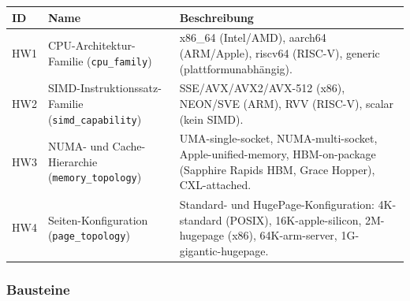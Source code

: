 \begin{scriptsize}
\begin{longtable}{@{}>{\raggedright\arraybackslash}p{1.8cm} >{\raggedright\arraybackslash}p{3.2cm} >{\raggedright\arraybackslash}p{8.5cm}@{}}
\toprule
ID & Name & Beschreibung \\
\midrule
\endhead%
HW1 & CPU-Architektur-Familie (\texttt{cpu\_\allowbreak{}family}) & x86\_\allowbreak{}64 (Intel/\allowbreak{}AMD), aarch64 (ARM/\allowbreak{}Apple), riscv64 (RISC-V), generic (plattformunabhängig). \\
HW2 & SIMD-Instruktionssatz-Familie (\texttt{simd\_\allowbreak{}capability}) & SSE/\allowbreak{}AVX/\allowbreak{}AVX2/\allowbreak{}AVX-512 (x86), NEON/\allowbreak{}SVE (ARM), RVV (RISC-V), scalar (kein SIMD). \\
HW3 & NUMA- und Cache-Hierarchie (\texttt{memory\_\allowbreak{}topology}) & UMA-single-socket, NUMA-multi-socket, Apple-unified-memory, HBM-on-package (Sapphire Rapids HBM, Grace Hopper), CXL-attached. \\
HW4 & Seiten-Konfiguration (\texttt{page\_\allowbreak{}topology}) & Standard- und HugePage-Konfiguration: 4K-standard (POSIX), 16K-apple-silicon, 2M-hugepage (x86), 64K-arm-server, 1G-gigantic-hugepage. \\
\bottomrule
\end{longtable}
\end{scriptsize}

\subsubsection*{Bausteine}

